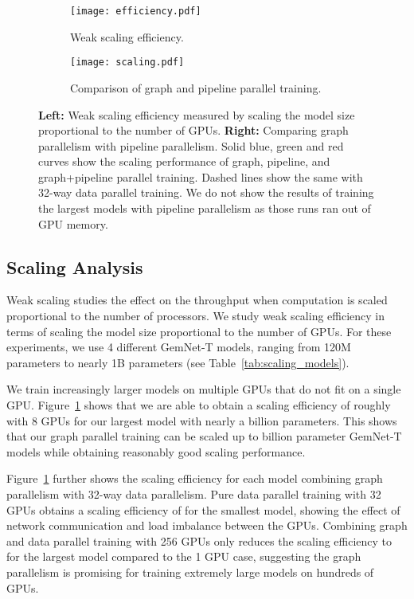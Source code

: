 \documentclass{article} \usepackage{iclr2022_conference,times}
\begin{document}
\begin{figure}[h]
     \begin{subfigure}[b]{0.5\textwidth}
         \centering
         \texttt{[image: efficiency.pdf]}
         \caption{Weak scaling efficiency.}
\label{fig:weak_scaling}
     \end{subfigure}
     \quad
     \begin{subfigure}[b]{0.5\textwidth}
         \centering
         \texttt{[image: scaling.pdf]}
         \caption{Comparison of graph and pipeline parallel training.}
\label{fig:gp_ddp}
     \end{subfigure}

\caption{\textbf{Left:} Weak scaling efficiency measured by scaling the model size proportional to the number of GPUs. \textbf{Right:} Comparing graph parallelism with pipeline parallelism. Solid blue, green and red curves show the scaling performance of graph, pipeline, and graph+pipeline parallel training. Dashed lines show the same with 32-way data parallel training. We do not show the results of training the largest models with pipeline parallelism as those runs ran out of GPU memory.}
\vspace{-10pt}
\end{figure}

\subsection{Scaling Analysis}
\label{sec:scaling}

Weak scaling studies the effect on the throughput when computation is scaled proportional to the number of processors. We study weak scaling efficiency in terms of scaling the model size proportional to the number of GPUs. For these experiments, we use 4 different GemNet-T models, ranging from 120M parameters to nearly 1B parameters (see Table~\ref{tab:scaling_models}).

We train increasingly larger models on multiple GPUs that do not fit on a single GPU. Figure~\ref{fig:weak_scaling} shows that we are able to obtain a scaling efficiency of roughly  with 8 GPUs for our largest model with nearly a billion parameters. This shows that our graph parallel training can be scaled up to billion parameter GemNet-T models while obtaining reasonably good scaling performance.

Figure~\ref{fig:weak_scaling} further shows the scaling efficiency for each model combining graph parallelism with 32-way data parallelism. Pure data parallel training with 32 GPUs obtains a scaling efficiency of  for the smallest model, showing the effect of network communication and load imbalance between the GPUs. Combining graph and data parallel training with 256 GPUs only reduces the scaling efficiency to  for the largest model compared to the 1 GPU case, suggesting the graph parallelism is promising for training extremely large models on hundreds of GPUs.
\end{document}
